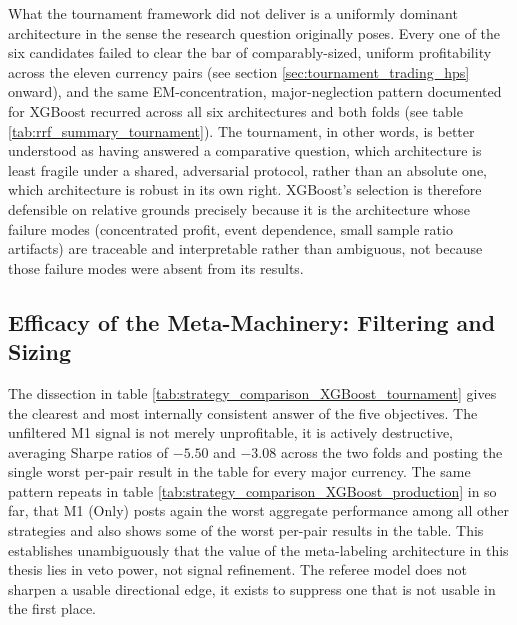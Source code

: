 \documentclass[12pt, a4paper]{article}
\begin{document}
\medskip

What the tournament framework did not deliver is a uniformly dominant architecture in the sense the research question originally poses. Every one of the six candidates 
failed to clear the bar of comparably-sized, uniform profitability across the eleven currency pairs (see section \ref{sec:tournament_trading_hps} onward), and the same EM-concentration, 
major-neglection pattern documented for XGBoost recurred across all six architectures and both folds (see table \ref{tab:rrf_summary_tournament}). The tournament, in other words, is 
better understood as having answered a comparative question, which architecture is least fragile under a shared, adversarial protocol, rather than an absolute one, which architecture 
is robust in its own right. XGBoost's selection is therefore defensible on relative grounds precisely because it is the architecture whose failure modes (concentrated profit, event 
dependence, small sample ratio artifacts) are traceable and interpretable rather than ambiguous, not because those failure modes were absent from its results.


\subsection{Efficacy of the Meta-Machinery: Filtering and Sizing}

The dissection in table \ref{tab:strategy_comparison_XGBoost_tournament} gives the clearest and most internally consistent answer of the five objectives. The unfiltered M1 signal is 
not merely unprofitable, it is actively destructive, averaging Sharpe ratios of $-5.50$ and $-3.08$ across the two folds and posting the single worst per-pair result in the table for 
every major currency. The same pattern repeats in table \ref{tab:strategy_comparison_XGBoost_production} in so far, that M1 (Only) posts again the worst aggregate performance among all 
other strategies and also shows some of the worst per-pair results in the table. This establishes unambiguously that the value of the meta-labeling architecture in this thesis lies in 
veto power, not signal refinement. The referee model does not sharpen a usable directional edge, it exists to suppress one that is not usable in the first place.

\medskip
\end{document}
